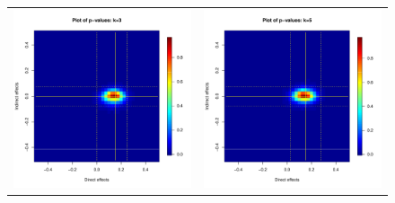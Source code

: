 \documentclass[12pt]{article}
\begin{document}
\begin{figure}
	\centering
	\begin{tabular}{cc}
	\includegraphics[scale=0.45]{./images/pval_plot_bergan_ideo_3nn.pdf} &
	\includegraphics[scale=0.45]{./images/pval_plot_bergan_ideo_5nn.pdf} \\ 

\end{tabular}
\end{figure}
\end{document}
